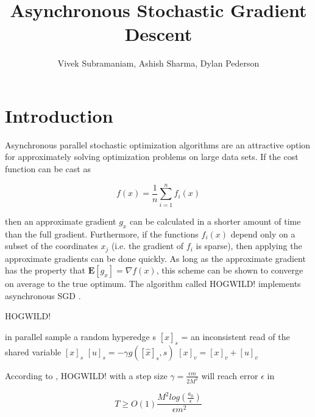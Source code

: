 \documentclass{article}
\begin{document}
\title{Asynchronous Stochastic Gradient Descent}%
\author{Vivek Subramaniam, Ashish Sharma, Dylan Pederson}


\maketitle

 


\section{Introduction}\label{sec:intro}
Asynchronous parallel stochastic optimization algorithms are an attractive option for approximately solving optimization problems on large data sets. If the cost function can be cast as

\begin{equation}\label{eqn:erm}
	f(x) = \frac{1}{n}\sum_{i=1}^n f_i(x)
\end{equation}

then an approximate gradient $g_x$ can be calculated in a shorter amount of time than the full gradient. Furthermore, if the functions $f_i(x)$ depend only on a subset of the coordinates $x_j$ (i.e. the gradient of $f_i$ is sparse), then applying the approximate gradients can be done quickly. As long as the approximate gradient has the property that $\mathbf{E}[g_x] = \nabla f(x)$, this scheme can be shown to converge on average to the true optimum. The algorithm called HOGWILD! implements asynchronous SGD \cite{niu2011}. 

\begin{algorithm}
	\caption{HOGWILD!}\label{hogwild!}
	\begin{algorithmic}[1]
	 in parallel
	\State sample a random hyperedge s
	\State $[\hat{x}]_s$ = an inconsistent read of the shared variable $[x]_s$
	\State $[u]_s = -\gamma g([\hat{x}]_s, s)$
		\State $[x]_v = [x]_v + [u]_v$
	\EndFor
	\EndWhile
	\end{algorithmic}
\end{algorithm}
 
According to \cite{horia2016}, HOGWILD! with a step size $\gamma = \frac{\epsilon m}{2 M^2}$ will reach error $\epsilon$ in 

\begin{equation}
	T \ge O(1)\frac{M^2 log(\frac{a_0}{\epsilon})}{\epsilon m^2}
\end{equation}
\end{document}
